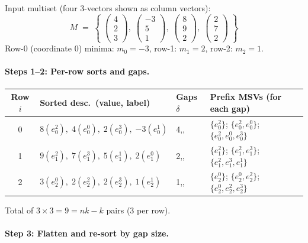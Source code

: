 \documentclass[11pt,a4paper]{article}
\newcommand{\eji}[2]{e^{#1}_{#2}}           %
\begin{document}
Input multiset (four 3-vectors shown as column vectors):
\[
  M \;=\; \left\{\;
    \begin{pmatrix}4\\2\\3\end{pmatrix},\;
    \begin{pmatrix}-3\\5\\1\end{pmatrix},\;
    \begin{pmatrix}8\\9\\2\end{pmatrix},\;
    \begin{pmatrix}2\\7\\2\end{pmatrix}
  \;\right\}
\]
Row-0 (coordinate 0) minima: $m_0 = {-3}$,\; row-1: $m_1 = 2$,\; row-2: $m_2 = 1$.

\paragraph{Steps 1–2: Per-row sorts and gaps.}

\begin{center}
\small
\renewcommand{\arraystretch}{1.2}
\begin{tabular}{clll}
  \toprule
  Row $i$ & Sorted desc.\ (value, label) & Gaps $\delta$ & Prefix MSVs (for each gap) \\
  \midrule
  0 & $8(\eji{2}{0}),\;4(\eji{0}{0}),\;2(\eji{3}{0}),\;{-3}(\eji{1}{0})$
    & 4,\;2,\;5
    & $\{\eji{2}{0}\}$;\;
      $\{\eji{2}{0},\eji{0}{0}\}$;\;
      $\{\eji{2}{0},\eji{0}{0},\eji{3}{0}\}$ \\[3pt]
  1 & $9(\eji{2}{1}),\;7(\eji{3}{1}),\;5(\eji{1}{1}),\;2(\eji{0}{1})$
    & 2,\;2,\;3
    & $\{\eji{2}{1}\}$;\;
      $\{\eji{2}{1},\eji{3}{1}\}$;\;
      $\{\eji{2}{1},\eji{3}{1},\eji{1}{1}\}$ \\[3pt]
  2 & $3(\eji{0}{2}),\;2(\eji{2}{2}),\;2(\eji{3}{2}),\;1(\eji{1}{2})$
    & 1,\;0,\;1
    & $\{\eji{0}{2}\}$;\;
      $\{\eji{0}{2},\eji{2}{2}\}$;\;
      $\{\eji{0}{2},\eji{2}{2},\eji{3}{2}\}$ \\
  \bottomrule
\end{tabular}
\end{center}

\noindent
Total of $3 \times 3 = 9 = nk-k$ pairs (3 per row).

\paragraph{Step 3: Flatten and re-sort by gap size.}
\end{document}
